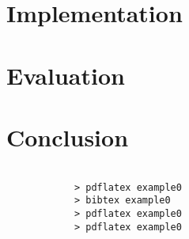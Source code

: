 \documentclass{l4proj}
\begin{document}
\chapter{Implementation}

\chapter{Evaluation}


\chapter{Conclusion}
\begin{verbatim}

            > pdflatex example0
            > bibtex example0
            > pdflatex example0
            > pdflatex example0

\end{verbatim}

\end{document}
